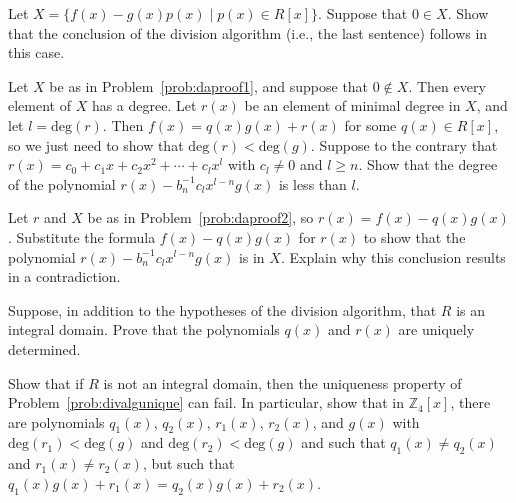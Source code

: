 \begin{problem}\label{prob:daproof1}
Let \(X = \{f(x)-g(x)p(x) \mid p(x) \in R[x] \}\). Suppose that \(0 \in X\). Show that the conclusion of the division algorithm (i.e., the last sentence) follows in this case.
\end{problem}

\begin{problem}\label{prob:daproof2}
Let \(X\) be as in Problem~\ref{prob:daproof1}, and suppose that \(0 \not\in X\). Then every element of \(X\) has a degree. Let \(r(x)\) be an element of minimal degree in \(X\), and let $l = \mbox{deg}(r)$. Then \(f(x) = q(x)g(x) + r(x)\) for some \(q(x)\in R[x]\), so we just need to show that \(\mbox{deg}(r) < \mbox{deg}(g) \). Suppose to the contrary that \(r(x) = c_0 + c_1x + c_2x^2 + \cdots + c_lx^l\) with \(c_l\neq 0\) and \(l \geq n\). Show that the degree of the polynomial \(r(x)-b_n^{-1}c_lx^{l-n}g(x)\) is less than $l$.
\end{problem}

\begin{problem}\label{prob:daproof3}
Let \(r\) and \(X\) be as in  Problem~\ref{prob:daproof2}, so $r(x) = f(x) - q(x)g(x)$. Substitute the formula $f(x) - q(x)g(x)$ for $r(x)$ to show that the polynomial \(r(x)-b_n^{-1}c_lx^{l-n}g(x)\) is in \(X\). Explain why this conclusion results in a contradiction.
\begin{annotation}
\end{annotation}
\end{problem}

\begin{problem}\label{prob:divalgunique}
Suppose, in addition to the hypotheses of the division algorithm, that \(R\) is an integral domain. Prove that the polynomials \(q(x)\) and \(r(x)\) are uniquely determined.
\end{problem}

\begin{problem}
Show that if $R$ is not an integral domain, then the uniqueness property of Problem~\ref{prob:divalgunique} can fail. In particular, show that in \(\mathbb{Z}_4[x]\), there are polynomials \(q_1(x)\), \(q_2(x)\), \(r_1(x)\), \(r_2(x)\), and \(g(x)\) with \(\mbox{deg}(r_1)<\mbox{deg}(g)\) and \(\mbox{deg}(r_2)<\mbox{deg}(g)\) and such that \(q_1(x) \neq q_2(x)\) and \(r_1(x) \neq r_2(x)\), but such that \(q_1(x)g(x) +r_1(x) = q_2(x)g(x)+r_2(x)\).
\end{problem}

